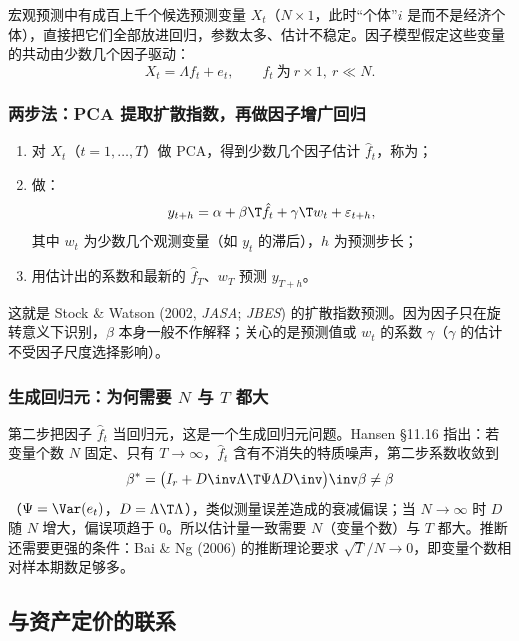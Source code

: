 宏观预测中有成百上千个候选预测变量 $X_t$（$N\times1$，此时“个体”$i$ 是而不是经济个体），直接把它们全部放进回归，参数太多、估计不稳定。因子模型假定这些变量的共动由少数几个因子驱动：
\[
X_t=\Lambda f_t+e_t,\qquad f_t\ \text{为}\ r\times1,\ r\ll N .
\]

\subsubsection{两步法：PCA 提取扩散指数，再做因子增广回归}

\begin{method}
\begin{enumerate}
\item 对 $X_t$（$t=1,\dots,T$）做 PCA，得到少数几个因子估计 $\hat f_t$，称为；
\item 做：
\[
y_{t+h}=\alpha+\beta\T\hat f_t+\gamma\T w_t+\varepsilon_{t+h},
\]
其中 $w_t$ 为少数几个观测变量（如 $y_t$ 的滞后），$h$ 为预测步长；
\item 用估计出的系数和最新的 $\hat f_T$、$w_T$ 预测 $y_{T+h}$。
\end{enumerate}
\end{method}
这就是 Stock \& Watson (2002, \emph{JASA}; \emph{JBES}) 的扩散指数预测。因为因子只在旋转意义下识别，$\beta$ 本身一般不作解释；关心的是预测值或 $w_t$ 的系数 $\gamma$（$\gamma$ 的估计不受因子尺度选择影响）。

\subsubsection{生成回归元：为何需要 \texorpdfstring{$N$}{N} 与 \texorpdfstring{$T$}{T} 都大}

第二步把因子 $\hat f_t$ 当回归元，这是一个生成回归元问题。Hansen §11.16 指出：若变量个数 $N$ 固定、只有 $T\to\infty$，$\hat f_t$ 含有不消失的特质噪声，第二步系数收敛到
\[
\beta^*=\bigl(I_r+D\inv\Lambda\T\Psi\Lambda D\inv\bigr)\inv\beta\neq\beta
\]
（$\Psi=\Var(e_t)$，$D=\Lambda\T\Lambda$），类似测量误差造成的衰减偏误；当 $N\to\infty$ 时 $D$ 随 $N$ 增大，偏误项趋于 0。所以估计量一致需要 $N$（变量个数）与 $T$ 都大。推断还需要更强的条件：Bai \& Ng (2006) 的推断理论要求 $\sqrt T/N\to0$，即变量个数相对样本期数足够多。

\subsection{与资产定价的联系 \tagext}

